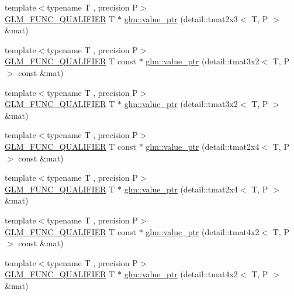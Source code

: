 \begin{DoxyCompactItemize}
\item 
{\footnotesize template$<$typename T , precision P$>$ }\\\hyperlink{setup_8hpp_a33fdea6f91c5f834105f7415e2a64407}{G\+L\+M\+\_\+\+F\+U\+N\+C\+\_\+\+Q\+U\+A\+L\+I\+F\+I\+ER} T $\ast$ \hyperlink{group__gtc__type__ptr_gaaba8179ff5559d8b4493499313eb7a02}{glm\+::value\+\_\+ptr} (detail\+::tmat2x3$<$ T, P $>$ \&mat)
\item 
{\footnotesize template$<$typename T , precision P$>$ }\\\hyperlink{setup_8hpp_a33fdea6f91c5f834105f7415e2a64407}{G\+L\+M\+\_\+\+F\+U\+N\+C\+\_\+\+Q\+U\+A\+L\+I\+F\+I\+ER} T const  $\ast$ \hyperlink{group__gtc__type__ptr_gaf8edbe29063a5b8221fc8afcb6af224d}{glm\+::value\+\_\+ptr} (detail\+::tmat3x2$<$ T, P $>$ const \&mat)
\item 
{\footnotesize template$<$typename T , precision P$>$ }\\\hyperlink{setup_8hpp_a33fdea6f91c5f834105f7415e2a64407}{G\+L\+M\+\_\+\+F\+U\+N\+C\+\_\+\+Q\+U\+A\+L\+I\+F\+I\+ER} T $\ast$ \hyperlink{group__gtc__type__ptr_gae2e604002202417c7156db3deeb1301d}{glm\+::value\+\_\+ptr} (detail\+::tmat3x2$<$ T, P $>$ \&mat)
\item 
{\footnotesize template$<$typename T , precision P$>$ }\\\hyperlink{setup_8hpp_a33fdea6f91c5f834105f7415e2a64407}{G\+L\+M\+\_\+\+F\+U\+N\+C\+\_\+\+Q\+U\+A\+L\+I\+F\+I\+ER} T const  $\ast$ \hyperlink{group__gtc__type__ptr_ga7b738eac576043c00c39bda2fc515d7b}{glm\+::value\+\_\+ptr} (detail\+::tmat2x4$<$ T, P $>$ const \&mat)
\item 
{\footnotesize template$<$typename T , precision P$>$ }\\\hyperlink{setup_8hpp_a33fdea6f91c5f834105f7415e2a64407}{G\+L\+M\+\_\+\+F\+U\+N\+C\+\_\+\+Q\+U\+A\+L\+I\+F\+I\+ER} T $\ast$ \hyperlink{group__gtc__type__ptr_ga59b17271f4f487e556383b715f9b8534}{glm\+::value\+\_\+ptr} (detail\+::tmat2x4$<$ T, P $>$ \&mat)
\item 
{\footnotesize template$<$typename T , precision P$>$ }\\\hyperlink{setup_8hpp_a33fdea6f91c5f834105f7415e2a64407}{G\+L\+M\+\_\+\+F\+U\+N\+C\+\_\+\+Q\+U\+A\+L\+I\+F\+I\+ER} T const  $\ast$ \hyperlink{group__gtc__type__ptr_ga73acc0dbfeeb9e6c09df1f79fd990b84}{glm\+::value\+\_\+ptr} (detail\+::tmat4x2$<$ T, P $>$ const \&mat)
\item 
{\footnotesize template$<$typename T , precision P$>$ }\\\hyperlink{setup_8hpp_a33fdea6f91c5f834105f7415e2a64407}{G\+L\+M\+\_\+\+F\+U\+N\+C\+\_\+\+Q\+U\+A\+L\+I\+F\+I\+ER} T $\ast$ \hyperlink{group__gtc__type__ptr_ga478c7dc470b36836ac5392e852fd2348}{glm\+::value\+\_\+ptr} (detail\+::tmat4x2$<$ T, P $>$ \&mat)

\end{DoxyCompactItemize}
